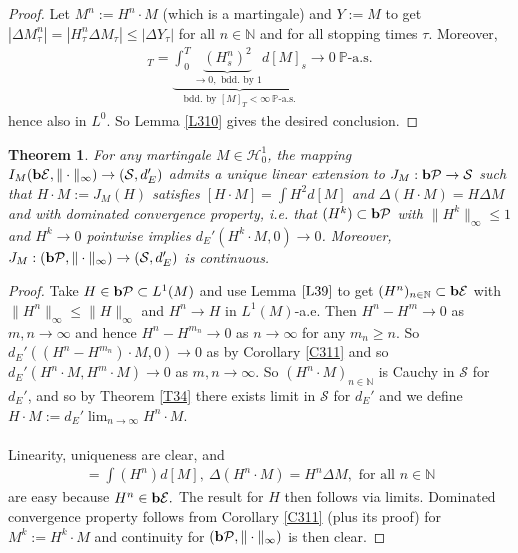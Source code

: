 \documentclass[12pt,a4paper, twoside]{article}
\newtheorem{thm}{Theorem}[section]
\theoremstyle{definition}
\newcommand{\PP}{\mathbb{P}} %
\newcommand{\simple}{\textbf{\text{b}}\mathcal{E}}
\newcommand{\pred}{\textbf{\text{b}}\mathcal{P}}
\begin{document}
\begin{proof}
Let $M^n:= H^n \cdot M$ (which is a martingale) and $Y:= M$ to get $| \Delta M_\tau^n| = | H_\tau^n \Delta M_\tau | \leq | \Delta Y_\tau|$ for all $n \in \mathbb{N}$ and for all stopping times $\tau$. Moreover,
\begin{align*}
[M^n]_T = \underbrace{\int_0^T \underbrace{( H_s^n)^2}_{ \to 0, \text{ bdd. by $1$}} d[M]_s}_{ \text{bdd. by } [M]_T < \infty \ \PP\text{-a.s.}} \to 0 \ \PP\text{-a.s.}
\end{align*}
hence also in $L^0$. So Lemma \ref{L310} gives the desired conclusion.
\end{proof}
\newpage
\begin{thm}\label{T312} For any martingale $M \in \mathcal{H}_0^1$, the mapping $I_M( \simple, \| \cdot \|_\infty) \to ( \mathcal{S},  d_E')$ admits a unique linear extension to $J_M: \pred \to \mathcal{S}$ such that $H \cdot M := J_M(H)$ satisfies $[H \cdot M] = \int H^2 d [M]$ and $\Delta (H \cdot M) = H \Delta M$ and with dominated convergence property, i.e. that $(H^k) \subset \pred$ with $\|H^k\|_\infty \leq 1$ and $H^k \to 0$ pointwise implies $d_E'(H^k \cdot M, 0) \to 0$. Moreover, $J_M : ( \pred, \| \cdot \|_\infty) \to ( \mathcal{S}, d_E')$ is continuous. 
\end{thm}
\begin{proof}
Take $H \in \pred \subset L^1(M)$ and use Lemma $\ref{L39}$ to get $(H^n)_{n \in \mathbb{N}} \subset \simple$ with $\|H^n\|_\infty \leq \|H\|_\infty$ and $H^n \to H$ in $L^1(M)$-a.e. Then $H^n-H^m \to 0$ as $m,n \to \infty$ and hence $H^n-H^{m_n} \to 0$ as $n \to \infty$ for any $m_n \geq n$. So $d_E'((H^n-H^{m_n}) \cdot M, 0) \to 0$ as by Corollary \ref{C311} and so $d_E'(H^n \cdot M, H^m \cdot M) \to 0$ as $m,n \to \infty$. So $(H^n \cdot M)_{n \in \mathbb{N}}$ is Cauchy in $\mathcal{S}$ for $d_E'$, and so by Theorem \ref{T34} there exists limit in $\mathcal{S}$ for $d_E'$ and we define $H \cdot M:= d_E' \lim_{n \to \infty} H^n \cdot M$. \\
\\
Linearity, uniqueness are clear, and 
\begin{align*}
[H^n \cdot M] = \int(H^n) d[M], \ \Delta (H^n \cdot M) = H^n \Delta M, \text{ for all } n \in \mathbb{N}
\end{align*}
are easy because $H^n \in \simple.$ The result for $H$ then follows via limits. Dominated convergence property follows from Corollary \ref{C311} (plus its proof) for $M^k:= H^k \cdot M$ and continuity for $( \pred, \| \cdot \|_\infty)$ is then clear.
\end{proof}
\end{document}
